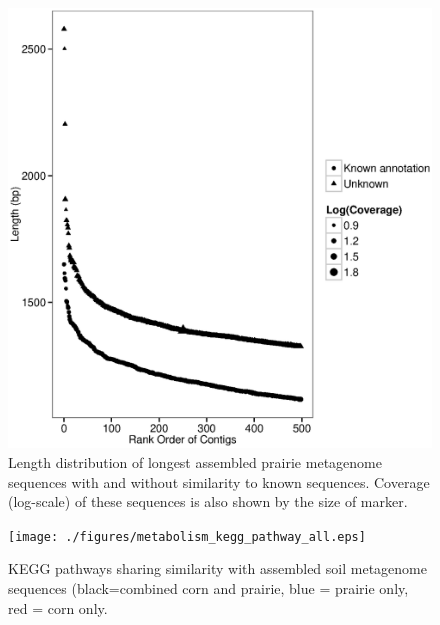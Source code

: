 \documentclass{pnastwo}
\begin{document}
\begin{figure}
\begin{center}
\centerline{\includegraphics[width=.7\textwidth]{./figures/prairie-cov-len-500.eps}}
\caption{Length distribution of longest assembled prairie metagenome sequences with and without similarity to known sequences.  Coverage (log-scale) of these sequences is also shown by the size of marker. }
\label{prairielength}
\end{center}
\end{figure}


\begin{figure}
\begin{center}
\centerline{\texttt{[image: ./figures/metabolism\_kegg\_pathway\_all.eps]}}
\caption{KEGG pathways sharing similarity with assembled soil metagenome sequences (black=combined corn and prairie, blue = prairie only, red = corn only.}
\label{kegg}
\end{center}
\end{figure}
\end{document}
